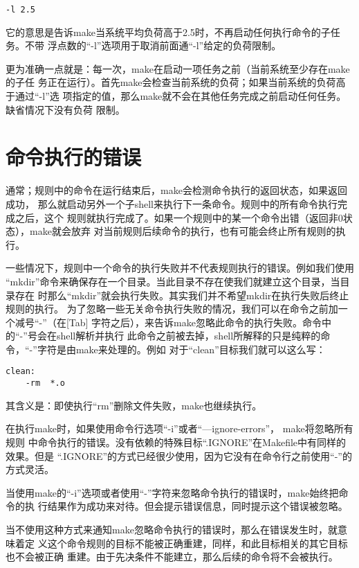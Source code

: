 \begin{Verbatim}[]
-l 2.5
\end{Verbatim}

它的意思是告诉make当系统平均负荷高于2.5时，不再启动任何执行命令的子任务。不带
浮点数的“-l”选项用于取消前面通“-l”给定的负荷限制。

更为准确一点就是：每一次，make在启动一项任务之前（当前系统至少存在make的子任
务正在运行）。首先make会检查当前系统的负荷；如果当前系统的负荷高于通过“-l”选
项指定的值，那么make就不会在其他任务完成之前启动任何任务。缺省情况下没有负荷
限制。

\section{命令执行的错误}
通常；规则中的命令在运行结束后，make会检测命令执行的返回状态，如果返回成功，%
那么就启动另外一个子shell来执行下一条命令。规则中的所有命令执行完成之后，这个%
规则就执行完成了。如果一个规则中的某一个命令出错（返回非0状态），make就会放弃%
对当前规则后续命令的执行，也有可能会终止所有规则的执行。

一些情况下，规则中一个命令的执行失败并不代表规则执行的错误。例如我们使用%
“mkdir”命令来确保存在一个目录。当此目录不存在使我们就建立这个目录，当目录存在%
时那么“mkdir”就会执行失败。其实我们并不希望mkdir在执行失败后终止规则的执行。%
为了忽略一些无关命令执行失败的情况，我们可以在命令之前加一个减号“-”（在[Tab]%
字符之后），来告诉make忽略此命令的执行失败。命令中的“-”号会在shell解析并执行%
此命令之前被去掉，shell所解释的只是纯粹的命令，“-”字符是由make来处理的。例如%
对于“clean”目标我们就可以这么写：

\begin{Verbatim}[]
clean:
    -rm  *.o
\end{Verbatim}

其含义是：即使执行“rm”删除文件失败，make也继续执行。

在执行make时，如果使用命令行选项“-i”或者“—ignore-errors”， make将忽略所有规则
中命令执行的错误。没有依赖的特殊目标“.IGNORE”在Makefile中有同样的效果。但是
“.IGNORE”的方式已经很少使用，因为它没有在命令行之前使用“-”的方式灵活。

当使用make的“-i”选项或者使用“-”字符来忽略命令执行的错误时，make始终把命令的执
行结果作为成功来对待。但会提示错误信息，同时提示这个错误被忽略。

当不使用这种方式来通知make忽略命令执行的错误时，那么在错误发生时，就意味着定
义这个命令规则的目标不能被正确重建，同样，和此目标相关的其它目标也不会被正确
重建。由于先决条件不能建立，那么后续的命令将不会被执行。

